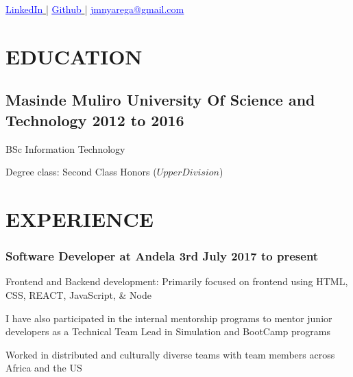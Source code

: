 \documentclass{article}
\author{Josiah Mokobo Nyarega}
\begin{document}
\renewcommand{\maketitle}{
  \begin{center}
    {
      \huge\bfseries
      \theauthor
    }

    \href{https://www.linkedin.com/in/josiah-nyarega-84820a103}{
      \textcolor{blue}{
        \underline{LinkedIn}
      }
    } |
    \href{https://www.github.com/jmnyarega}{
      \textcolor{blue}{
      \underline{Github}
      }
    } |
    \href{jmnyarega@gmail.com}{
      \textcolor{blue}{
        \underline{jmnyarega@gmail.com}
      }
    }
\end{center}
}
\maketitle

\section{EDUCATION}
\subsection{Masinde Muliro University Of Science and Technology\hspace{130pt} \textbf{2012 to 2016}}
\begin{description}[font=$\bullet$~\normalfont\scshape\color{red!50!black}]
  \item{BSc Information Technology}
  \item{Degree class: Second Class Honors (\(Upper Division\))}
\end{description}
\section{EXPERIENCE}
\subsubsection{Software Developer at Andela\hspace{190pt} \textbf{3rd July 2017 to present}}
\begin{description}[font=$\bullet$~\normalfont\scshape\color{red!50!black}]
  \item{Frontend and Backend development: Primarily focused on frontend using HTML, CSS, REACT, JavaScript, \& Node}
  \item{I have also participated in the internal mentorship programs to mentor junior developers as a Technical Team Lead in Simulation and BootCamp programs}
  \item{Worked in distributed and culturally diverse teams with team members across Africa and the US}
\end{description}
\end{document}
